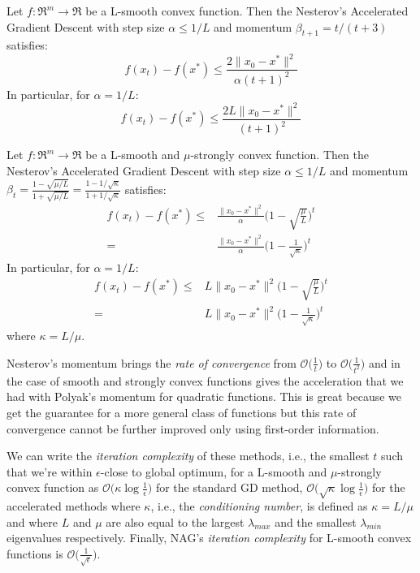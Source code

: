 \begin{theorem} \label{thm:cvx_nag_convergence}
Let $f: \Re^m \rightarrow \Re$ be a L-smooth convex function. Then the Nesterov's Accelerated Gradient Descent with step size $\alpha \leq 1/L$ and momentum $\beta_{t+1} = t / (t+3)$ satisfies:
$$
f(x_t) - f(x^*) \leq \frac{2 \| x_0 - x^* \|^2}{\alpha (t+1)^2}
$$
In particular, for $\alpha = 1/L$:
$$
f(x_t) - f(x^*) \leq \frac{2L \| x_0 - x^* \|^2}{(t+1)^2}
$$
\end{theorem}

\begin{theorem} \label{thm:str_cvx_nag_convergence}
Let $f: \Re^m \rightarrow \Re$ be a L-smooth and $\mu$-strongly convex function. Then the Nesterov's Accelerated Gradient Descent with step size $\alpha \leq 1/L$ and momentum $\beta_t = \displaystyle \frac{1 - \sqrt{\mu / L}}{1 + \sqrt{\mu / L}} = \frac{1-1/\sqrt{\kappa}}{1+1/\sqrt{\kappa}}$ satisfies:
$$
\begin{aligned}
	f(x_t) - f(x^*) \leq & \frac{\| x_0 - x^* \|^2}{\alpha} \Bigg(1 - \sqrt{\frac{\mu}{L}}\Bigg)^t \\
						= & \frac{\| x_0 - x^* \|^2}{\alpha} \Bigg(1 - \frac{1}{\sqrt{\kappa}}\Bigg)^t
\end{aligned}
$$
In particular, for $\alpha = 1/L$:
$$
\begin{aligned}
	f(x_t) - f(x^*) \leq & L \| x_0 - x^* \|^2 \Bigg(1 - \sqrt{\frac{\mu}{L}}\Bigg)^t \\
						= & L \| x_0 - x^* \|^2 \Bigg(1 - \frac{1}{\sqrt{\kappa}}\Bigg)^t
\end{aligned}
$$
where $\kappa = L/\mu$.
\end{theorem}

Nesterov's momentum brings the \emph{rate of convergence} from $\displaystyle \mathcal{O}\Big(\frac{1}{t}\Big)$ to $\displaystyle \mathcal{O}\Big(\frac{1}{t^2}\Big)$ and in the case of smooth and strongly convex functions gives the acceleration that we had with Polyak’s momentum for quadratic functions. This is great because we get the guarantee for a more general class of functions but this rate of convergence cannot be further improved only using first-order information.

\bigskip

We can write the \emph{iteration complexity} of these methods, i.e., the smallest $t$ such that we’re within $\epsilon$-close to global optimum, for a L-smooth and $\mu$-strongly convex function as $\displaystyle \mathcal{O}\Big(\kappa \log \frac{1}{\epsilon}\Big)$ for the standard GD method, $\displaystyle \mathcal{O}\Big(\sqrt{\kappa}\log \frac{1}{\epsilon}\Big)$ for the accelerated methods where $\kappa$, i.e., the \emph{conditioning number}, is defined as $\kappa = L/\mu$ and where $L$ and $\mu$ are also equal to the largest $\lambda_{max}$ and the smallest $\lambda_{min}$ eigenvalues respectively. Finally, NAG's \emph{iteration complexity} for L-smooth convex functions is $\displaystyle \mathcal{O}\Big(\frac{1}{\sqrt{\epsilon}}\Big)$.

